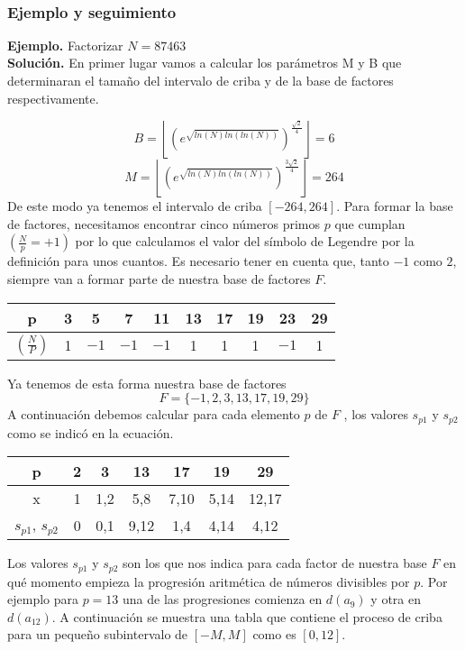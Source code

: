\documentclass[11pt, conference]{IEEEtran}
\begin{document}
\

\subsubsection[Ejemplo y seguimiento]{\textbf{Ejemplo y seguimiento}}
\textbf{Ejemplo.} Factorizar $N = 87463$\\
\textbf{Solución.} En primer lugar vamos a calcular los parámetros M y B que determinaran el tamaño del intervalo de criba y de la base de factores respectivamente. 

\[
	B = \left\lfloor\left( e^{\sqrt{ln(N)ln(ln(N))}} \right)^{\frac{\sqrt{2}}{4}}\right\rfloor = 6
\]
\[
M = \left\lfloor\left( e^{\sqrt{ln(N)ln(ln(N))}} \right)^{\frac{3\sqrt{2}}{4}}\right\rfloor = 264
\]
De este modo ya tenemos el intervalo de criba $[-264, 264]$. Para formar la base de factores, necesitamos encontrar cinco números primos $p$ que cumplan $(\frac{N}{p} = +1)$ por lo que calculamos el valor del símbolo de Legendre por la definición para unos cuantos. Es necesario tener en cuenta que, tanto $-1$ como $2$, siempre van a formar parte de nuestra base de factores $F$.

\begin{table}[htb]
	\begin{center}
		\begin{tabular}{|c|c|c|c|c|c|c|c|c|c|}
			\hline
			p & 3 & 5 & 7& 11&13&17&19&23&29\\
			\hline\hline
			$\left(\frac{N}{P}\right)$&1&$-1$&$-1$&$-1$&1&1&1&$-1$&1\\
			\hline
		\end{tabular}
	\end{center}
\end{table}

Ya tenemos de esta forma nuestra base de factores
\[
	F = \{-1,2,3,13,17,19,29\}
\]
A continuación debemos calcular para cada elemento $p$ de $F$ , los valores $s_{p1}$ y $s_{p2}$ como se indicó en la ecuación.

\begin{table}[htb]
	\begin{center}
		\begin{tabular}{|c|c|c|c|c|c|c|}
			\hline
			p & 2 & 3 & 13&17&19&29\\
			\hline\hline
			x &1&1,2&5,8&7,10&5,14&12,17\\
			\hline
			$s_{p1}$, $s_{p2}$ &0&0,1&9,12&1,4&4,14&4,12\\
			\hline
		\end{tabular}
	\end{center}
\end{table}
Los valores $s_{p1}$ y $s_{p2}$ son los que nos indica para cada factor de nuestra base $F$ en qué momento empieza la progresión aritmética de números divisibles por $p$. Por ejemplo para $p = 13$ una de las progresiones comienza en $d(a _9)$ y otra en $d(a_{12})$. A continuación se muestra una tabla que contiene el proceso de criba para un pequeño subintervalo de $[-M, M ]$ como es $[0, 12]$.
\end{document}

